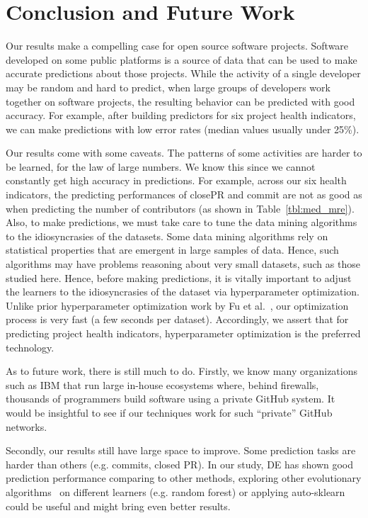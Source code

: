 \documentclass[smallextended]{svjour3}
\newcommand{\respto}[1]{
\fcolorbox{black}{black!15}{%
\label{resp:#1}%
\bf\scriptsize R{#1}}}
\newcommand{\BLUE}{\color{blue}}
\newcommand{\BLACK}{\color{black}}
\begin{document}
\section{Conclusion and Future Work}
\label{sect:concl}

 

Our results make a compelling case for open source software projects. 
Software developed on some public platforms is a source of data that can be used to make accurate predictions  about those projects. While the activity of a single developer may be random and hard to predict, when large groups of developers work together on software projects,
the resulting behavior can be predicted with good accuracy. For example, after building predictors for six project health indicators, we can make predictions with low error rates (median values usually under 25\%). 

\BLUE
Our results come with some caveats. The patterns of some activities are harder to be learned, for the law of large numbers. We know this since we cannot constantly get high accuracy in predictions. For example, 
across our six health indicators, the predicting performances of closePR and commit are not as good as when predicting the number of contributors (as shown in Table~\ref{tbl:med_mre}). 
\BLACK
 Also, to make predictions, we must take care to tune the data mining algorithms to the idiosyncrasies of the datasets.
 Some data mining algorithms rely on statistical properties that are emergent in large samples of data.
 Hence, such algorithms may have problems reasoning about very small datasets, such as those studied here.
 Hence, before making predictions, it is vitally   important to adjust the learners to the idiosyncrasies of the dataset via hyperparameter optimization. Unlike prior hyperparameter optimization work by Fu et al.~\cite{Fu2016TuningFS}, our optimization process is very fast (a few seconds per dataset). Accordingly, we assert that for predicting project health indicators, hyperparameter optimization is the preferred technology.
 
As to future work, there is still much to do. 
Firstly, we know many organizations such as IBM that run large in-house ecosystems where, behind firewalls, thousands of programmers build software using  a private GitHub system. It would be insightful to see if our techniques work for such ``private'' GitHub networks.
\BLUE
\respto{2G5} \respto{4H1} Secondly, our results still have large space to improve. Some prediction tasks are harder than others
(e.g. commits, closed PR).
In our study, DE has shown good prediction performance comparing to other methods, exploring other evolutionary algorithms~\cite{wu2018ensemble,das2016recent} on different learners (e.g. random forest) or applying auto-sklearn~\cite{feurer2019auto} could be useful and might bring even better results.
\end{document}
